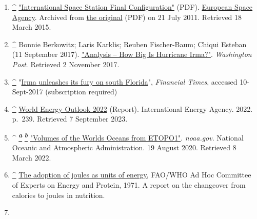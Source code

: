 \documentclass[
]{article}
\newenvironment{LTR}{\beginL}{\endL}
\begin{document}
\begin{LTR}
\begin{otherlanguage}{english}
\begin{enumerate}
\item
  \label{cite_note-iss-20}{{\textbf{\hyperref[cite_ref-iss_20-0]{\^{}}}}
  {\href{https://web.archive.org/web/20110721012349/http://www.spaceflight.esa.int/users/downloads/factsheets/fs001_12_iss.pdf}{"International
  Space Station Final Configuration"} {(PDF)}.
  \href{/wiki/European_Space_Agency}{European Space Agency}. Archived
  from
  \href{http://www.spaceflight.esa.int/users/downloads/factsheets/fs001_12_iss.pdf}{the
  original} {(PDF)} on 21 July 2011{. Retrieved {18 March} 2015}.{}}}
\item
  \label{cite_note-21}{{\textbf{\hyperref[cite_ref-21]{\^{}}}}
  {Bonnie Berkowitz; Laris Karklis; Reuben Fischer-Baum; Chiqui Esteban
  (11 September 2017).
  \href{https://www.washingtonpost.com/graphics/2017/national/how-big-is-hurricane-irma/}{"Analysis
  -- How Big Is Hurricane Irma?"}. \emph{Washington Post}{. Retrieved {2
  November} 2017}.{}}}
\item
  \label{cite_note-22}{{\textbf{\hyperref[cite_ref-22]{\^{}}}}
  {"\href{https://www.ft.com/content/2c58ce3e-9621-11e7-b83c-9588e51488a0}{Irma
  unleashes its fury on south Florida}", \emph{Financial Times},
  accessed 10-Sept-2017 {(subscription required)}}}
\item
  \label{cite_note-23}{{\textbf{\hyperref[cite_ref-23]{\^{}}}}
  {\href{https://www.iea.org/reports/world-energy-outlook-2022}{World
  Energy Outlook 2022} (Report). International Energy Agency. 2022.
  p.~239{. Retrieved {7 September} 2023}.{}}}
\item
  \label{cite_note-Volumes_of_the_Worldux27s_Oceans-24}{{\^{}
  \hyperref[cite_ref-Volumes_of_the_Worldux27s_Oceans_24-0]{\textsuperscript{\emph{\textbf{a}}}}
  \hyperref[cite_ref-Volumes_of_the_Worldux27s_Oceans_24-1]{\textsuperscript{\emph{\textbf{b}}}}}
  {\href{https://ngdc.noaa.gov/mgg/global/etopo1_ocean_volumes.html}{"Volumes
  of the World\textquotesingle s Oceans from ETOPO1"}. \emph{noaa.gov}.
  National Oceanic and Atmospheric Administration. 19 August 2020{.
  Retrieved {8 March} 2022}.{}}}
\item
  \label{cite_note-FAO-25}{{\textbf{\hyperref[cite_ref-FAO_25-0]{\^{}}}}
  {\href{http://www.fao.org/docrep/meeting/009/ae906e/ae906e17.htm}{The
  adoption of joules as units of energy}, FAO/WHO Ad Hoc Committee of
  Experts on Energy and Protein, 1971. A report on the changeover from
  calories to joules in nutrition.}}
\item

\end{enumerate}
\end{otherlanguage}
\end{LTR}
\end{document}
